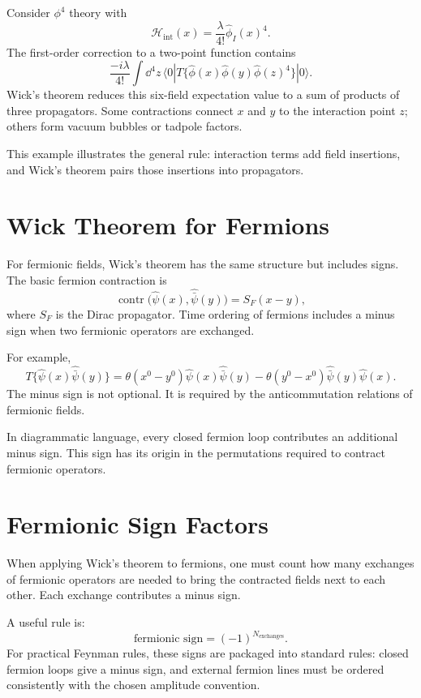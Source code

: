 Consider \(\phi^4\) theory with
\[
    \mathcal{H}_{\mathrm{int}}(x)
    = \frac{\lambda}{4!}\hat\phi_I(x)^4.
\]
The first-order correction to a two-point function contains
\[
    \frac{-i\lambda}{4!}\int\dd^4z\,
    \langle0|T\{\hat\phi(x)\hat\phi(y)\hat\phi(z)^4\}|0\rangle.
\]
Wick's theorem reduces this six-field expectation value to a sum of products of
three propagators. Some contractions connect \(x\) and \(y\) to the interaction
point \(z\); others form vacuum bubbles or tadpole factors.

This example illustrates the general rule: interaction terms add field
insertions, and Wick's theorem pairs those insertions into propagators.

\section{Wick Theorem for Fermions}

For fermionic fields, Wick's theorem has the same structure but includes signs.
The basic fermion contraction is
\[
    \operatorname{contr}\!\bigl(\hat\psi(x),\hat{\bar\psi}(y)\bigr)
    = S_F(x-y),
\]
where \(S_F\) is the Dirac propagator. Time ordering of fermions includes a
minus sign when two fermionic operators are exchanged.

For example,
\[
    T\{\hat\psi(x)\hat{\bar\psi}(y)\}
    = \theta(x^0-y^0)\hat\psi(x)\hat{\bar\psi}(y)
      -\theta(y^0-x^0)\hat{\bar\psi}(y)\hat\psi(x).
\]
The minus sign is not optional. It is required by the anticommutation relations
of fermionic fields.

In diagrammatic language, every closed fermion loop contributes an additional
minus sign. This sign has its origin in the permutations required to contract
fermionic operators.

\section{Fermionic Sign Factors}

When applying Wick's theorem to fermions, one must count how many exchanges of
fermionic operators are needed to bring the contracted fields next to each
other. Each exchange contributes a minus sign.

A useful rule is:
\[
    \text{fermionic sign} = (-1)^{N_{\mathrm{exchanges}}}.
\]
For practical Feynman rules, these signs are packaged into standard rules:
closed fermion loops give a minus sign, and external fermion lines must be
ordered consistently with the chosen amplitude convention.


